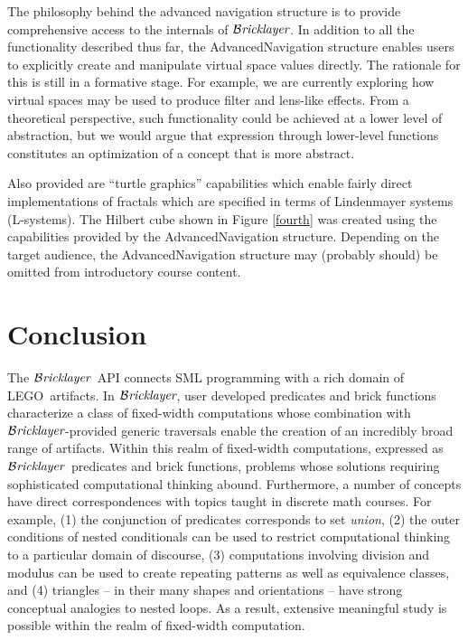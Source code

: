 \documentclass[submission,copyright,creativecommons]{eptcs}
\newcommand{\bricklayer}{\ensuremath{\mathcal{B}\emph{ricklayer}}}
\begin{document}
The philosophy behind the advanced navigation structure is to provide comprehensive access to the internals of \bricklayer. In addition to all the functionality described thus far, the AdvancedNavigation structure enables users to explicitly create and manipulate virtual space values directly. The rationale for this is still in a formative stage. For example, we are currently exploring how virtual spaces may be used to produce filter and lens-like effects. From a theoretical perspective, such functionality could be achieved at a lower level of abstraction, but we would argue that expression through lower-level functions constitutes an optimization of a concept that is more abstract.

Also provided are ``turtle graphics'' capabilities which enable fairly direct implementations of fractals which are specified in terms of Lindenmayer systems (L-systems). The Hilbert cube shown in Figure \ref{fourth} was created using the capabilities provided by the AdvancedNavigation structure. Depending on the target audience, the AdvancedNavigation structure may (probably should) be omitted from introductory course content.


\section{Conclusion}\label{section-conclusion}


The \bricklayer\ API connects SML programming with a rich domain of LEGO\textregistered\ artifacts. In \bricklayer, user developed predicates and brick functions characterize a class of fixed-width computations whose combination with \bricklayer\--provided generic traversals enable the creation of an incredibly broad range of artifacts. Within this realm of fixed-width computations, expressed as \bricklayer\ predicates and brick functions, problems whose solutions requiring sophisticated computational thinking abound.
Furthermore, a number of concepts have direct correspondences with topics taught in discrete math courses. For example, (1) the conjunction of predicates corresponds to set \emph{union}, (2) the outer conditions of nested conditionals can be used to restrict computational thinking to a particular domain of discourse, (3) computations involving division and modulus can be used to create repeating patterns as well as equivalence classes, and (4) triangles -- in their many shapes and orientations -- have strong conceptual analogies to nested loops. As a result, extensive meaningful study is possible within the realm of fixed-width computation.
\end{document}
